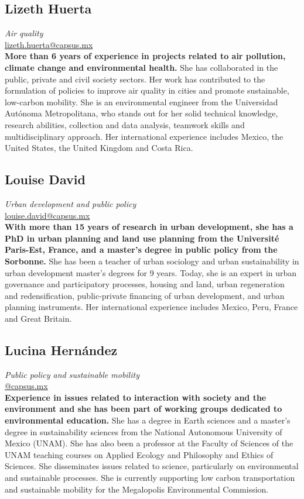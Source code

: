 \documentclass[
	a4paper,
	12pt,
	unnumberedsections,
]{CSSullivanBusinessReport}
\begin{document}
\subsection*{Lizeth Huerta}
\textit{Air quality} \\
\href{mailto:lizeth.huerta@capsus.mx}{lizeth.huerta@capsus.mx} \\[0.5em]
\textbf{More than 6 years of experience in projects related to air pollution, climate change and environmental health.} She has collaborated in the public, private and civil society sectors. Her work has contributed to the formulation of policies to improve air quality in cities and promote sustainable, low-carbon mobility. She is an environmental engineer from the Universidad Autónoma Metropolitana, who stands out for her solid technical knowledge, research abilities, collection and data analysis, teamwork skills and multidisciplinary approach. Her international experience includes Mexico, the United States, the United Kingdom and Costa Rica.

\subsection*{Louise David}
\textit{Urban development and public policy} \\
\href{mailto:louise.david@capsus.mx}{louise.david@capsus.mx} \\[0.5em]
\textbf{With more than 15 years of research in urban development, she has a PhD in urban planning and land use planning from the Université Paris-Est, France, and a master's degree in public policy from the Sorbonne.} She has been a teacher of urban sociology and urban sustainability in urban development master's degrees for 9 years. Today, she is an expert in urban governance and participatory processes, housing and land, urban regeneration and redensification, public-private financing of urban development, and urban planning instruments. Her international experience includes Mexico, Peru, France and Great Britain.

\subsection*{Lucina Hernández}
\textit{Public policy and sustainable mobility} \\
\href{mailto:@capsus.mx}{@capsus.mx} \\[0.5em]
\textbf{Experience in issues related to interaction with society and the environment and she has been part of working groups dedicated to environmental education.} She has a degree in Earth sciences and a master's degree in sustainability sciences from the National Autonomous University of Mexico (UNAM). She has also been a professor at the Faculty of Sciences of the UNAM teaching courses on Applied Ecology and Philosophy and Ethics of Sciences. She disseminates issues related to science, particularly on environmental and sustainable processes. She is currently supporting low carbon transportation and sustainable mobility for the Megalopolis Environmental Commission.
\end{document}
